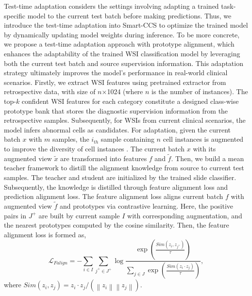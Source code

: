 Test-time adaptation considers the settings involving adapting a trained task-specific model to the current test batch before making predictions. Thus, we introduce the test-time adaptation into Smart-CCS to optimize the trained model by dynamically updating model weights during inference. To be more concrete, we propose a test-time adaptation approach with prototype alignment, which enhances the adaptability of the trained WSI classification model by leveraging both the current test batch and source supervision information. This adaptation strategy ultimately improves the model's performance in real-world clinical scenarios.
Firstly, we extract WSI features using pretrained extractor from retrospective data, with size of $n$×1024 (where $n$ is the number of instances).
The top-$k$ confident WSI features for each category constitute a designed class-wise prototype bank that stores the diagnostic supervision information from the retrospective samples. 
Subsequently, for WSIs from current clinical scenarios, the model infers abnormal cells as candidates. 
For adaptation, given the current batch $x$ with $m$ samples, the $i_{th}$ sample containing $n$ cell instances is augmented to improve the diversity of cell instances \cite{wang2022continual}. The current batch $x$ with its augmented view $\tilde{x}$ are transformed into features $f$ and $\tilde{f}$. Then, we build a mean teacher framework to distill the alignment knowledge from source to current test samples. The teacher and student are initialized by the trained slide classifier. Subsequently, the knowledge is distilled through feature alignment loss and prediction alignment loss. The feature alignment loss aligns current batch $f$ with augmented view $\tilde{f}$ and prototypes via contrastive learning. Here, the positive pairs in $J^{+}$ are built by current sample $I$ with corresponding augmentation, and the nearest prototypes computed by the cosine similarity. Then, the feature alignment loss is formed as, 
\begin{equation}
\mathcal{L}_{Falign}= - \sum_{i \in I}  \sum_{j^{+} \in J^{+}} \log \frac{\exp \left(\frac{Sim(z_i, z_{j^{+}}) }{ \tau}\right)}{\sum_{j \in J} \exp \left(\frac{Sim(z_i \cdot z_j)}{ \tau}\right)},
 \end{equation}
where $Sim(z_{i},z_{j})=z_{i} \cdot z_{j} /(\left\|z_{i}\right\|\left\|z_{j}\right\|)$. 



